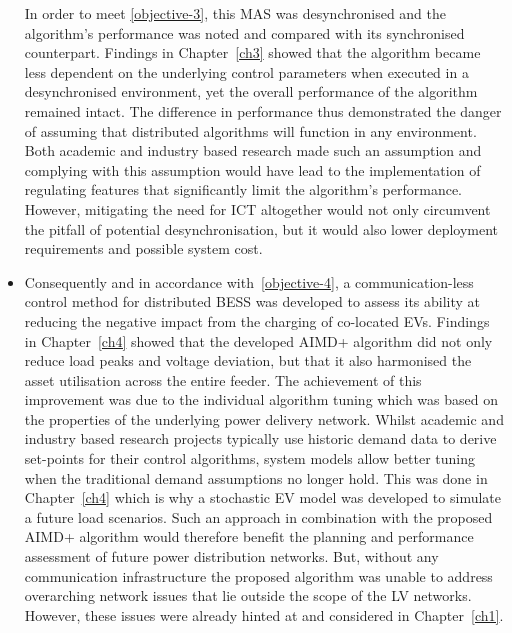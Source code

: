 \begin{itemize}
	In order to meet \ref{objective-3}, this MAS was desynchronised and the algorithm's performance was noted and compared with its synchronised counterpart.
	Findings in Chapter~\ref{ch3} showed that the algorithm became less dependent on the underlying control parameters when executed in a desynchronised environment, yet the overall performance of the algorithm remained intact.
	The difference in performance thus demonstrated the danger of assuming that distributed algorithms will function in any environment.
	Both academic and industry based research made such an assumption and complying with this assumption would have lead to the implementation of regulating features that significantly limit the algorithm's performance.
	However, mitigating the need for ICT altogether would not only circumvent the pitfall of potential desynchronisation, but it would also lower deployment requirements and possible system cost.
	\item
	Consequently and in accordance with \ref{objective-4}, a communication-less control method for distributed BESS was developed to assess its ability at reducing the negative impact from the charging of co-located EVs.
	Findings in Chapter~\ref{ch4} showed that the developed AIMD+ algorithm did not only reduce load peaks and voltage deviation, but that it also harmonised the asset utilisation across the entire feeder.
	The achievement of this improvement was due to the individual algorithm tuning which was based on the properties of the underlying power delivery network.
	Whilst academic and industry based research projects typically use historic demand data to derive set-points for their control algorithms, system models allow better tuning when the traditional demand assumptions no longer hold.
	This was done in Chapter~\ref{ch4} which is why a stochastic EV model was developed to simulate a future load scenarios.
	Such an approach in combination with the proposed AIMD+ algorithm would therefore benefit the planning and performance assessment of future power distribution networks.
	But, without any communication infrastructure the proposed algorithm was unable to address overarching network issues that lie outside the scope of the LV networks.
	However, these issues were already hinted at and considered in Chapter~\ref{ch1}.
\end{itemize}







